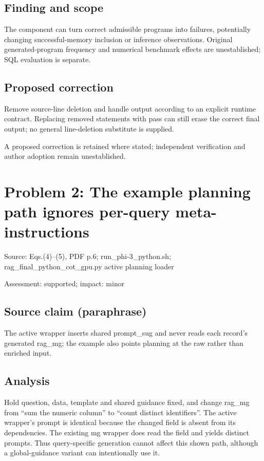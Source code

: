 \documentclass[11pt]{article}
\begin{document}
\subsection*{Finding and scope}

The component can turn correct admissible programs into failures, potentially changing successful-memory inclusion or inference observations. Original generated-program frequency and numerical benchmark effects are unestablished; SQL evaluation is separate.

\subsection*{Proposed correction}

Remove source-line deletion and handle output according to an explicit runtime contract. Replacing removed statements with pass can still erase the correct final output; no general line-deletion substitute is supplied.

A proposed correction is retained where stated; independent verification and author adoption remain unestablished.

\section*{Problem 2: The example planning path ignores per-query meta-instructions}

Source: Eqs.(4)–(5), PDF p.6; run\_phi-3\_python.sh; rag\_final\_python\_cot\_gpu.py active planning loader

Assessment: supported; impact: minor

\subsection*{Source claim (paraphrase)}

The active wrapper inserts shared prompt\_sug and never reads each record’s generated rag\_mg; the example also points planning at the raw rather than enriched input.

\subsection*{Analysis}

Hold question, data, template and shared guidance fixed, and change rag\_mg from “sum the numeric column” to “count distinct identifiers”. The active wrapper’s prompt is identical because the changed field is absent from its dependencies. The existing mg wrapper does read the field and yields distinct prompts. Thus query-specific generation cannot affect this shown path, although a global-guidance variant can intentionally use it.
\end{document}

